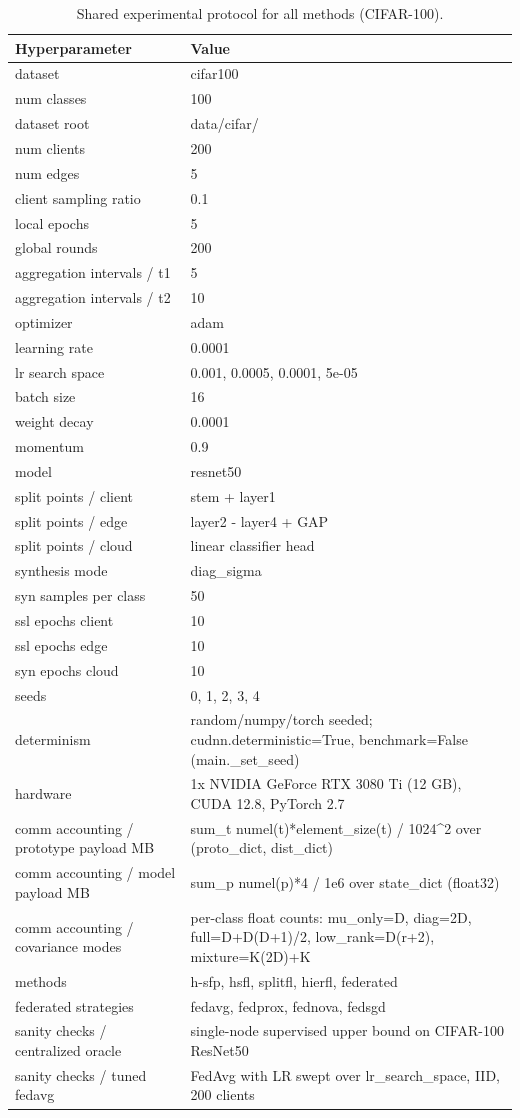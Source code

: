 \begin{table}[t]
\centering
\caption{Shared experimental protocol for all methods (CIFAR-100).}
\label{tab:fairness}
\begin{tabular}{ll}
\toprule
Hyperparameter & Value \\
\midrule
dataset & cifar100 \\
num classes & 100 \\
dataset root & data/cifar/ \\
num clients & 200 \\
num edges & 5 \\
client sampling ratio & 0.1 \\
local epochs & 5 \\
global rounds & 200 \\
aggregation intervals / t1 & 5 \\
aggregation intervals / t2 & 10 \\
optimizer & adam \\
learning rate & 0.0001 \\
lr search space & 0.001, 0.0005, 0.0001, 5e-05 \\
batch size & 16 \\
weight decay & 0.0001 \\
momentum & 0.9 \\
model & resnet50 \\
split points / client & stem + layer1 \\
split points / edge & layer2 - layer4 + GAP \\
split points / cloud & linear classifier head \\
synthesis mode & diag\_sigma \\
syn samples per class & 50 \\
ssl epochs client & 10 \\
ssl epochs edge & 10 \\
syn epochs cloud & 10 \\
seeds & 0, 1, 2, 3, 4 \\
determinism & random/numpy/torch seeded; cudnn.deterministic=True, benchmark=False (main.\_set\_seed) \\
hardware & 1x NVIDIA GeForce RTX 3080 Ti (12 GB), CUDA 12.8, PyTorch 2.7 \\
comm accounting / prototype payload MB & sum\_t numel(t)*element\_size(t) / 1024^2 over (proto\_dict, dist\_dict) \\
comm accounting / model payload MB & sum\_p numel(p)*4 / 1e6 over state\_dict (float32) \\
comm accounting / covariance modes & per-class float counts: mu\_only=D, diag=2D, full=D+D(D+1)/2, low\_rank=D(r+2), mixture=K(2D)+K \\
methods & h-sfp, hsfl, splitfl, hierfl, federated \\
federated strategies & fedavg, fedprox, fednova, fedsgd \\
sanity checks / centralized oracle & single-node supervised upper bound on CIFAR-100 ResNet50 \\
sanity checks / tuned fedavg & FedAvg with LR swept over lr\_search\_space, IID, 200 clients \\
\bottomrule
\end{tabular}
\end{table}
